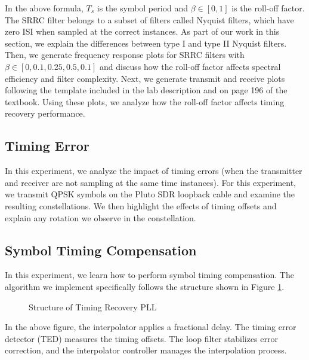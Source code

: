 \documentclass{article}
\begin{document}
\noindent In the above formula, $T_s$ is the symbol period and $\beta \in [0,1]$ is the roll-off factor. The SRRC filter belongs to a subset of filters called Nyquist filters, which have zero ISI when sampled at the correct instances. As part of our work in this section, we explain the differences between type I and type II Nyquist filters. Then, we generate frequency response plots for SRRC filters with $\beta \in [0, 0.1, 0.25, 0.5, 0.1]$ and discuss how the roll-off factor affects spectral efficiency and filter complexity. Next, we generate transmit and receive plots following the template included in the lab description and on page 196 of the textbook. Using these plots, we analyze how the roll-off factor affects timing recovery performance.

\subsection{Timing Error}

In this experiment, we analyze the impact of timing errors (when the transmitter and receiver are not sampling at the same time instances). For this experiment, we transmit QPSK symbols on the Pluto SDR loopback cable and examine the resulting constellations. We then highlight the effects of timing offsets and explain any rotation we observe in the constellation.

\subsection{Symbol Timing Compensation}

In this experiment, we learn how to perform symbol timing compensation. The algorithm we implement specifically follows the structure shown in Figure \ref{fig::timing_recovery_block_diagram}.

\begin{figure}[H]
	\centerline{}
	\caption{Structure of Timing Recovery PLL}
	\label{fig::timing_recovery_block_diagram}
\end{figure}

\noindent In the above figure, the interpolator applies a fractional delay. The timing error detector (TED) measures the timing offsets. The loop filter stabilizes error correction, and the interpolator controller manages the interpolation process.
\end{document}
